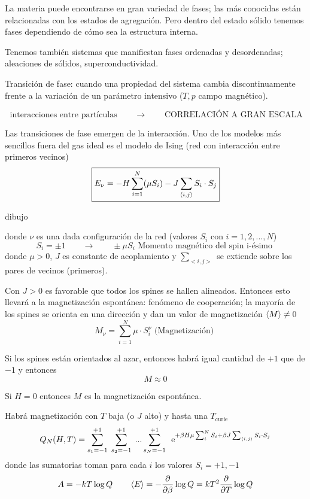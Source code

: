 \documentclass[10pt,oneside]{CBFT_book}
\begin{document}
La materia puede encontrarse en gran variedad de fases; las más conocidas están relacionadas con los estados de 
agregación. Pero dentro del estado sólido tenemos fases dependiendo de cómo sea la estructura interna.

Tenemos también sistemas que manifiestan fases ordenadas y desordenadas; aleaciones de sólidos, superconductividad.

Transición de fase: cuando una propiedad del sistema cambia discontinuamente frente a la variación de un parámetro 
intensivo ($T, p$ campo magnético).

\[
	\text{ interacciones entre partículas } \qquad \rightarrow \qquad \text{ CORRELACIÓN A GRAN ESCALA }  
\]

Las transiciones de fase emergen de la interacción. Uno de los modelos más sencillos fuera del gas ideal es el modelo de
Ising (red con interacción entre primeros vecinos)
\[
	\boxed{ E_\nu = -H \sum_{i=1}^N (\mu S_i) - J \sum_{\braket{i,j}} S_i \cdot S_j }
	\label{energia_ising}
\]

dibujo 


donde $\nu$ es una dada configuración de la red (valores $S_i$ con $i=1,2,...,N$)
\[
	S_i = \pm 1 \qquad \rightarrow \qquad \pm \mu S_i \text{ Momento magnético del spin i-ésimo }
\]
donde $\mu>0$, $J$ es constante de acoplamiento y $\sum_{<i,j>}$ se extiende sobre los pares de vecinos (primeros).

Con $J>0$ es favorable que todos los spines se hallen alineados. Entonces esto llevará a la magnetización espontánea: 
fenómeno de cooperación; la mayoría de los spines se orienta en una dirección y dan un valor de magnetización 
$\braket{M} \neq 0$
\[
	M_\nu = \sum_{i=1}^N \mu \cdot S_i^\nu
	\text{ (Magnetización) }
\]

Si los spines están orientados al azar, entonces habrá igual cantidad de $+1$ que de $-1$ y entonces
\[
	M \approx 0
\]

Si $H=0$ entonces $M$ es la magnetización espontánea.

Habrá magnetización con $T$ baja (o $J$ alto) y hasta una $T_\text{curie}$
\[
	Q_N(H,T) = \sum_{s_1=-1}^{+1} \; \sum_{s_2=-1}^{+1} \; ... \sum_{s_N=-1}^{+1} \;
	\:\mathrm{e}^{ +\beta H \mu \sum_i^N S_i + \beta J \sum_{\braket{i,j}} S_i \cdot S_j }
\]
donde las sumatorias toman para cada $i$ los valores $S_i = +1, -1$
\[
	A = -kT\log Q \qquad \braket{E} = -\frac{\partial^{\hspace{-0.05em}} {}}{\partial {\beta}^{\hspace{-0.05em}}}\log Q = kT^2 \frac{\partial^{\hspace{-0.05em}} {}}{\partial {T}^{\hspace{-0.05em}}} \log Q
\]
\end{document}
